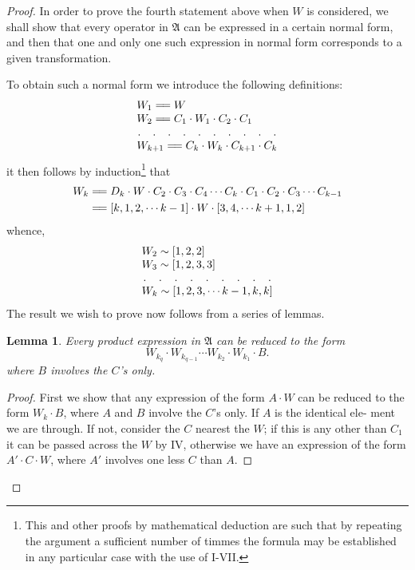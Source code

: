 \documentclass[10pt, twoside]{extarticle}
\newcommand\longeq{=\joinrel=}
\theoremstyle{breaktheorem}
\theoremstyle{mylemma}
\newtheorem{lemma}{Lemma}
\theoremstyle{mydefinition}
\theoremstyle{mycorollary}
\begin{document}
\begin{proof}
In order to prove the fourth statement above when \(W\) is considered, we
shall show that every operator in \(\mathfrak{A}\) can be expressed in a certain normal
form, and then that one and only one such expression in normal form
corresponds to a given transformation.

To obtain such a normal form we introduce the following definitions:
\begin{equation*}
  \renewcommand{\arraycolsep}{0pt}%
  \begin{array}{rl}
    &W_1 \longeq W \\
    &W_2 \longeq C_1 \cdot W_1 \cdot C_2 \cdot C_1 \\
    \hdotsfor[6]{2} \\
    &W_{k+1} \longeq C_k \cdot W_k \cdot C_{k+1} \cdot C_k
  \end{array}
\end{equation*}
it then follows by induction\footnote{This and other proofs by mathematical deduction are such that by repeating the argument a sufficient number of timmes the formula may be established in any particular case with the use of I-VII.} that
\begin{align*}
  W_k &\longeq D_k \cdot W \cdot C_2 \cdot C_3 \cdot C_4 \cdots C_k \cdot C_1 \cdot C_2 \cdot C_3 \cdots C_{k-1} \\
  &\longeq [k, 1, 2, \cdots k-1] \cdot W \cdot [3, 4, \cdots k+1, 1, 2]
\end{align*}
whence,
\begin{equation*}
  \renewcommand{\arraycolsep}{0pt}%
  \begin{array}{rl}
  &W_2 \sim [1, 2, 2] \\
  &W_3 \sim [1, 2, 3, 3] \\
  \hdotsfor[6]{2} \\
  &W_k \sim [1, 2, 3, \cdots k-1, k, k]
  \end{array}
\end{equation*}
The result we wish to prove now follows from a series of lemmas.

\begin{lemma}
  \label{lemma:1}
  Every product expression in \(\mathfrak{A}\) can be reduced to the form
  \begin{equation}
    \label{eq:product_reduction}
    W_{k_q} \cdot W_{k_{q-1}} \cdots W_{k_2} \cdot W_{k_1} \cdot B.
  \end{equation}
  where \(B\) involves the \(C\)'s only.
\end{lemma}
\begin{proof}
First we show that any expression of the form \(A \cdot W\) can be reduced to the
form \(W_k \cdot B\), where \(A\) and \(B\) involve the \(C\)'s only. If \(A\) is the identical ele-
ment we are through. If not, consider the \(C\) nearest the \(W\); if this is any
other than \(C_1\) it can be passed across the \(W\) by IV, otherwise we have an
expression of the form \(A' \cdot C \cdot W\), where \(A'\) involves one less \(C\) than \(A\).


\end{proof}
\end{proof}
\end{document}
